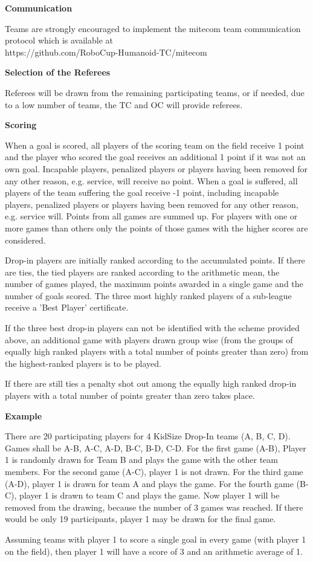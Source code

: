 {\bigskip
 
{\bfseries Communication}

Teams are strongly encouraged to implement the mitecom team communication protocol which is available at \\
\textcolor[rgb]{0.0,0.0,0.49803922}{https://github.com/RoboCup-Humanoid-TC/mitecom}

\bigskip
 
{\bfseries Selection of the Referees}

Referees will be drawn from the remaining participating teams, or if needed, due to a low number of teams, the TC and OC will provide referees.

\bigskip
 
{\bfseries Scoring}

When a goal is scored, all players of the scoring team on the field receive 1 point and the player who scored the goal receives an additional 1 point if it was not an own goal. Incapable players, penalized players or players having been removed for any other reason, e.g. service, will receive no point. When a goal is suffered, all players of the team suffering the goal receive -1 point, including incapable players, penalized players or players having been removed for any other reason, e.g. service will. Points from all games are summed up. For players with one or more games than others only the points of those games with the higher scores are considered.

Drop-in players are initially ranked according to the accumulated points. If there are ties, the tied players are ranked according to the arithmetic mean, the number of games played, the maximum points awarded in a single game and the number of goals scored. The three most highly ranked players of a sub-league receive a 'Best Player' certificate.

If the three best drop-in players can not be identified with the scheme provided above, an additional game with players drawn group wise (from the groups of equally high ranked players with a total number of points greater than zero) from the highest-ranked players is to be played.

If there are still ties a penalty shot out among the equally high ranked drop-in players with a total number of points greater than zero takes place.

\bigskip 
 
{\bfseries Example}
 
There are 20 participating players for 4 KidSize Drop-In teams (A, B, C, D). Games shall be A-B, A-C, A-D, B-C, B-D, C-D. For the first game (A-B), Player 1 is randomly drawn for Team B and plays the game with the other team members. For the second game (A-C), player 1 is not drawn. For the third game (A-D), player 1 is drawn for team A and plays the game. For the fourth game (B-C), player 1 is drawn to team C and plays the game. Now player 1 will be removed from the drawing, because the number of 3 games was reached. If there would be only 19 participants, player 1 may be drawn for the final game.

Assuming teams with player 1 to score a single goal in every game (with player 1 on the field), then player 1 will have a score of 3 and an arithmetic average of 1. }

